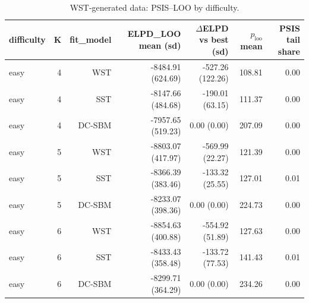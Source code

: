 \begin{table}[!h]
\centering
\caption{WST-generated data: PSIS–LOO by difficulty.\\\label{tab:wst-appx-diff-psis-loo}}
\centering
\begin{tabular}[t]{lrrrrrr}
\toprule
difficulty & K & fit_model & ELPD\_LOO mean (sd) & $\Delta$ELPD vs best (sd) & $p_{\text{loo}}$ mean & PSIS tail share\\
\midrule
easy & 4 & WST & -8484.91 (624.69) & -527.26 (122.26) & 108.81 & 0.00\\
easy & 4 & SST & -8147.66 (484.68) & -190.01 (63.15) & 111.37 & 0.00\\
easy & 4 & DC-SBM & -7957.65 (519.23) & 0.00 (0.00) & 207.09 & 0.00\\
easy & 5 & WST & -8803.07 (417.97) & -569.99 (22.27) & 121.39 & 0.00\\
easy & 5 & SST & -8366.39 (383.46) & -133.32 (25.55) & 127.01 & 0.01\\
easy & 5 & DC-SBM & -8233.07 (398.36) & 0.00 (0.00) & 224.73 & 0.00\\
easy & 6 & WST & -8854.63 (400.88) & -554.92 (51.89) & 127.63 & 0.00\\
easy & 6 & SST & -8433.43 (358.48) & -133.72 (77.53) & 141.43 & 0.01\\
easy & 6 & DC-SBM & -8299.71 (364.29) & 0.00 (0.00) & 234.26 & 0.00\\
\bottomrule
\end{tabular}
\end{table}
